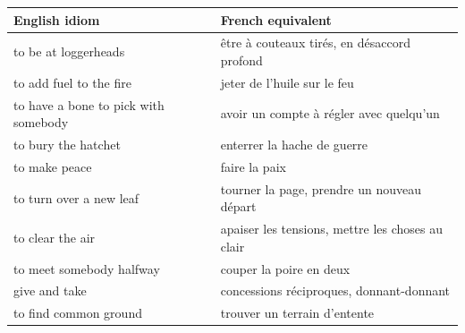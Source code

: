 \documentclass[11pt]{article}
\begin{document}
\begin{center}
\begin{tabularx}{\linewidth}{|X|X|}
\hline
\rowcolor{popblueL} \textbf{English idiom} & \textbf{French equivalent} \\
\hline
to be at loggerheads & être à couteaux tirés, en désaccord profond \\
\hline
to add fuel to the fire & jeter de l'huile sur le feu \\
\hline
to have a bone to pick with somebody & avoir un compte à régler avec quelqu'un \\
\hline
to bury the hatchet & enterrer la hache de guerre \\
\hline
to make peace & faire la paix \\
\hline
to turn over a new leaf & tourner la page, prendre un nouveau départ \\
\hline
to clear the air & apaiser les tensions, mettre les choses au clair \\
\hline
to meet somebody halfway & couper la poire en deux \\
\hline
give and take & concessions réciproques, donnant-donnant \\
\hline
to find common ground & trouver un terrain d'entente \\
\hline
\end{tabularx}
\end{center}
\end{document}
